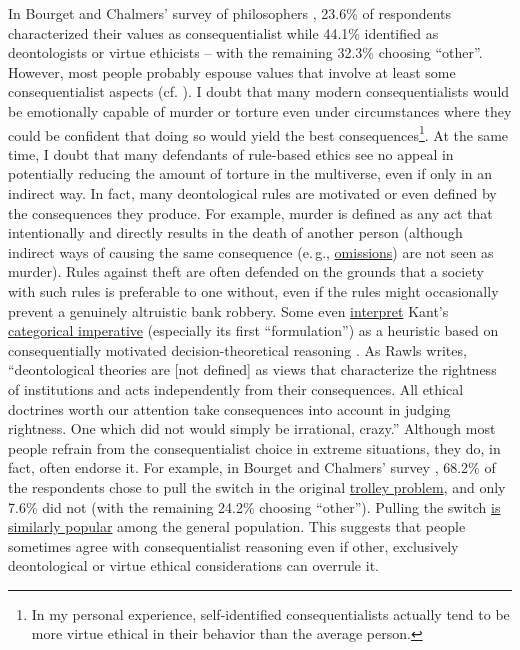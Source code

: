 In Bourget and Chalmers' survey of philosophers \parencite{Bourget2014-fm}, 23.6\%
of respondents characterized their values as consequentialist while
44.1\% identified as deontologists or virtue ethicists -- with the
remaining 32.3\% choosing ``other''. However, most people probably
espouse values that involve at least some consequentialist aspects (cf.
\cite{Muehlhauser2012-ib}). I doubt that many modern
consequentialists would be emotionally capable of murder or torture even
under circumstances where they could be confident that doing so would
yield the best consequences\footnote{In my personal experience,
  self-identified consequentialists actually tend to be more virtue
  ethical in their behavior than the average person.}. At the same time,
I doubt that many defendants of rule-based ethics see no appeal in
potentially reducing the amount of torture in the multiverse, even if
only in an indirect way. In fact, many deontological rules are motivated
or even defined by the consequences they produce. For example, murder is
defined as any act that intentionally and directly results in the death
of another person (although indirect ways of causing the same
consequence (e.\,g.,
\href{https://en.wikipedia.org/wiki/Omission_bias}{omissions})
are not seen as murder). Rules against theft are often defended on the
grounds that a society with such rules is preferable to one without,
even if the rules might occasionally prevent a genuinely altruistic bank
robbery. Some even
\href{http://briantomasik.com/interpreting-the-categorical-imperative/\#Categorical_imperative_as_decision_theory}{interpret}
Kant's
\href{https://en.wikipedia.org/wiki/Categorical_imperative}{categorical
imperative} (especially its first ``formulation'') as a heuristic based
on consequentially motivated decision-theoretical reasoning
\parencite{Parfit2011-xj,Hare1993-gi}. As Rawls \citeyear{Rawls1971-sq}
writes, ``deontological theories
are {[}not defined{]} as views that characterize the rightness of
institutions and acts independently from their consequences. All ethical
doctrines worth our attention take consequences into account in judging
rightness. One which did not would simply be irrational, crazy.''
Although most people refrain from the consequentialist choice in extreme
situations, they do, in fact, often endorse it. For example, in
Bourget and Chalmers' survey \citeyear{Bourget2014-fm}, 68.2\% of the respondents
chose to pull the switch in the original
\href{https://en.wikipedia.org/wiki/Trolley_problem}{trolley
problem}, and only 7.6\% did not (with the remaining 24.2\% choosing
``other''). Pulling the switch
\href{https://en.wikipedia.org/wiki/Trolley_problem\#Psychology}{is
similarly popular} among the general population. This suggests that
people sometimes agree with consequentialist reasoning even if other,
exclusively deontological or virtue ethical considerations can overrule
it.

